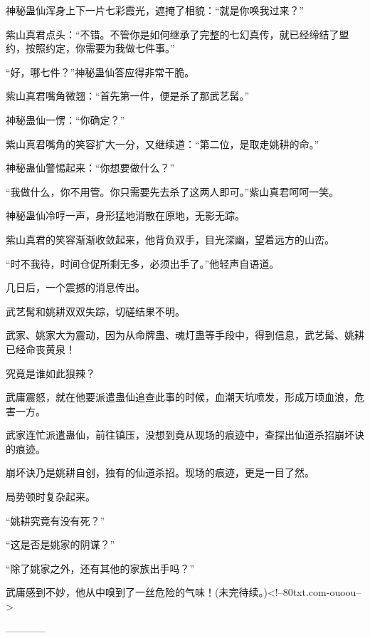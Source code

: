\begin{this_body}
神秘蛊仙浑身上下一片七彩霞光，遮掩了相貌：“就是你唤我过来？”

紫山真君点头：“不错。不管你是如何继承了完整的七幻真传，就已经缔结了盟约，按照约定，你需要为我做七件事。”

“好，哪七件？”神秘蛊仙答应得非常干脆。

紫山真君嘴角微翘：“首先第一件，便是杀了那武艺髯。”

神秘蛊仙一愣：“你确定？”

紫山真君嘴角的笑容扩大一分，又继续道：“第二位，是取走姚耕的命。”

神秘蛊仙警惕起来：“你想要做什么？”

“我做什么，你不用管。你只需要先去杀了这两人即可。”紫山真君呵呵一笑。

神秘蛊仙冷哼一声，身形猛地消散在原地，无影无踪。

紫山真君的笑容渐渐收敛起来，他背负双手，目光深幽，望着远方的山峦。

“时不我待，时间仓促所剩无多，必须出手了。”他轻声自语道。

几日后，一个震撼的消息传出。

武艺髯和姚耕双双失踪，切磋结果不明。

武家、姚家大为震动，因为从命牌蛊、魂灯蛊等手段中，得到信息，武艺髯、姚耕已经命丧黄泉！

究竟是谁如此狠辣？

武庸震怒，就在他要派遣蛊仙追查此事的时候，血潮天坑喷发，形成万顷血浪，危害一方。

武家连忙派遣蛊仙，前往镇压，没想到竟从现场的痕迹中，查探出仙道杀招崩坏诀的痕迹。

崩坏诀乃是姚耕自创，独有的仙道杀招。现场的痕迹，更是一目了然。

局势顿时复杂起来。

“姚耕究竟有没有死？”

“这是否是姚家的阴谋？”

“除了姚家之外，还有其他的家族出手吗？”

武庸感到不妙，他从中嗅到了一丝危险的气味！(未完待续。)<!--80txt.com-ouoou-->

------------

\end{this_body}

